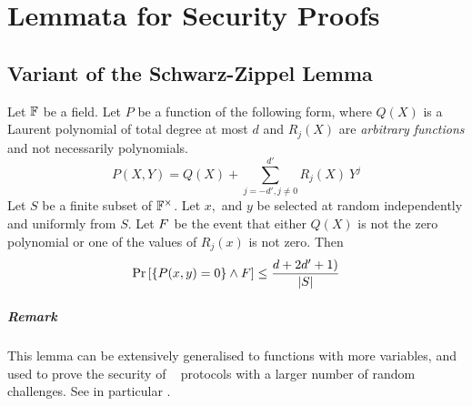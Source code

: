 \chapter{Lemmata for Security Proofs}
\label{chapterlabel:AlgIntProofs}

\section{Variant of the Schwarz-Zippel Lemma}
\begin{lemma}
\label{lem:szvariant}
Let $\mathbb{F}$ be a field. Let $P$ be a function of the following form, where $Q(X)$ is a Laurent polynomial of total degree at most $d$ and $R_j(X)$ are \emph{arbitrary functions} and not necessarily polynomials.
\[
P(X,Y) = Q(X) + \sum_{j=-d', j \neq 0}^{d'} R_{j}(X) \ Y^{j}
\]
Let $S$ be a finite subset of $\mathbb{F}^\times$. Let $x,$ and $y$ be selected at random independently and uniformly from $S$. Let $F$ be the event that either $Q(X)$ is not the zero polynomial or one of the values of $R_j(x)$ is not zero. Then
\[
\Pr \left[ \lbrace P(x,y) = 0 \rbrace \wedge F \right] \leq \frac{d+2d'+1)}{|S|}
\]
\end{lemma}
\paragraph{Remark} This lemma can be extensively generalised to functions with more variables, and used to prove the security of \ILC~ protocols with a larger number of random challenges. See in particular \cite{BootleCGGHJ17}.

